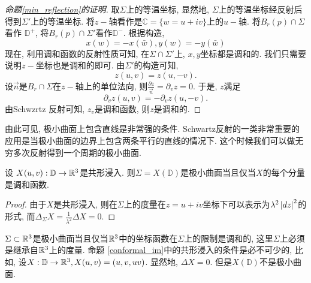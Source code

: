 \begin{proof}[命题\eqref{min_reflection}的证明]
    取$\Sigma$上的等温坐标, 显然地, $\Sigma$上的等温坐标经反射后得到$\Sigma'$上的等温坐标. 将$z-$轴看作是$\mathbb{C}=\{w=u+iv\}$上的$u-$轴. 将$B_r(p)\cap \Sigma$看作 $\mathbb{D}^+$, 将$B_r(p) \cap \Sigma'$看作$\mathbb{D}^-$. 根据构造, 
    \begin{equation}
        x(w)=-x(\bar{w}), y(w)=-y(\bar{w})
    \end{equation}
    现在, 利用调和函数的反射性质可知, 在$\Sigma \cap \Sigma'$上, $x,y$坐标都是调和的. 我们只需要说明$z-$坐标也是调和的即可. 由$\Sigma'$的构造可知, 
    \begin{equation}
        z(u,v)=z(u,-v). 
    \end{equation}
    设$\vec{n}$是$B_r\cap \Sigma$在$z-$轴上的单位法向, 则$\frac{\partial z}{\vec{n}}= \partial_v{z}=0$. 于是, $z$满足 
    \begin{equation}
        \partial_v z(u,v)=-\partial_v z(u,-v). 
    \end{equation}
    由Schwzrtz 反射可知, $z_v$是调和函数, 则$z$是调和的. 
\end{proof}
\begin{remark}
    由此可见, 极小曲面上包含直线是非常强的条件. Schwartz反射的一类非常重要的应用是当极小曲面的边界上包含两条平行的直线的情况下.  这个时候我们可以做无穷多次反射得到一个周期的极小曲面.
\end{remark}
\begin{proposition} \label{conformal_im}
    设 $X(u,v): \mathbb{D} \to \mathbb{R}^3$是共形浸入. 则$\Sigma = X(\mathbb{D})$是极小曲面当且仅当$X$的每个分量是调和函数.
\end{proposition}
\begin{proof}
    由于$X$是共形浸入, 则在$\Sigma$上的度量在$z=u+iv$坐标下可以表示为$\lambda^2\left | dz \right |^2$的形式, 而$\Delta_\Sigma X= \frac{1}{\lambda^2} \Delta X=0$.
\end{proof}
\begin{remark}
    $\Sigma\subset \mathbb{R}^3$是极小曲面当且仅当$\mathbb{R}^3$中的坐标函数在$\Sigma$上的限制是调和的, 这里$\Sigma$上必须是继承自$\mathbb{R}^3$上的度量. 命题 \eqref{conformal_im}中的共形浸入的条件是必不可少的, 比如, 设$X:\mathbb{D}\to \mathbb{R}^3, X(u,v)=(u,v,uv)$. 显然地, $\Delta X=0$. 但是$X(\mathbb{D})$不是极小曲面.
\end{remark}
